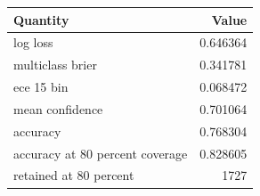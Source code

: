 \begin{tabular}{lr}
\toprule
Quantity & Value \\
\midrule
log loss & 0.646364 \\
multiclass brier & 0.341781 \\
ece 15 bin & 0.068472 \\
mean confidence & 0.701064 \\
accuracy & 0.768304 \\
accuracy at 80 percent coverage & 0.828605 \\
retained at 80 percent & 1727 \\
\bottomrule
\end{tabular}
